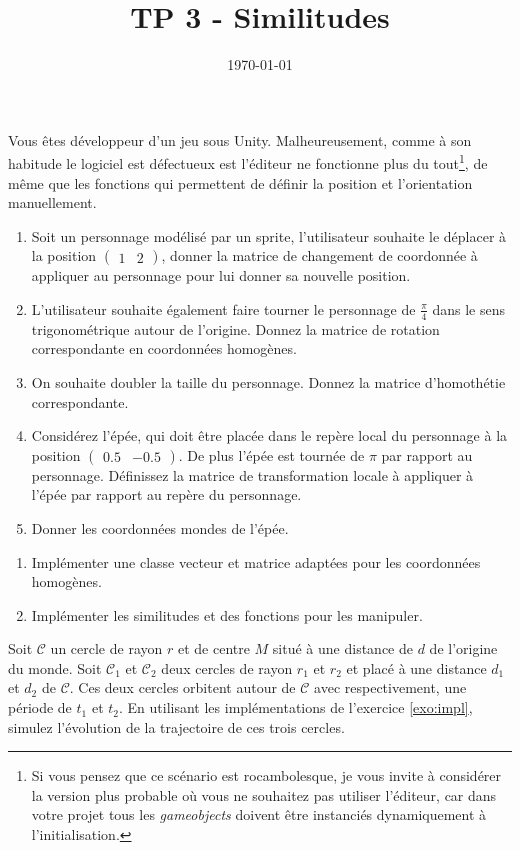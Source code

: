 \documentclass[a4paper,12pt]{article}
\title{TP 3 - Similitudes}
\author{}
\date{\today}
\begin{document}
\makeonlytitle


\label{exo:theorique}

Vous êtes développeur d'un jeu sous Unity. Malheureusement, comme à son habitude le logiciel est défectueux est l'éditeur ne fonctionne plus du tout\footnote{Si vous pensez que ce scénario est rocambolesque, je vous invite à considérer la version plus probable où vous ne souhaitez pas utiliser l'éditeur, car dans votre projet tous les \textit{gameobjects} doivent être instanciés dynamiquement à l'initialisation.}, de même que les fonctions qui permettent de définir la position et l'orientation manuellement.  

\begin{enumerate}
  \item Soit un personnage modélisé par un sprite, l'utilisateur souhaite le déplacer à la position $\begin{pmatrix} 1 & 2\end{pmatrix}$, donner la matrice de changement de coordonnée à appliquer au personnage pour lui donner sa nouvelle position.
  \item L'utilisateur souhaite également faire tourner le personnage de \(\frac{\pi}{4}\) dans le sens trigonométrique autour de l'origine. Donnez la matrice de rotation correspondante en coordonnées homogènes.
  \item On souhaite doubler la taille du personnage. Donnez la matrice d'homothétie correspondante.
  \item Considérez l'épée, qui doit être placée dans le repère local du personnage à la position $\begin{pmatrix} 0.5 & -0.5 \end{pmatrix}$. De plus l'épée est tournée de $\pi$ par rapport au personnage. Définissez la matrice de transformation locale à appliquer à l'épée par rapport au repère du personnage.
  \item Donner les coordonnées mondes de l'épée.
\end{enumerate}

\label{exo:impl}


\begin{enumerate}
  \item Implémenter une classe vecteur et matrice adaptées pour les coordonnées homogènes.
  \item Implémenter les similitudes et des fonctions pour les manipuler.
\end{enumerate}


Soit $\mathcal{C}$ un cercle de rayon $r$ et de centre $M$ situé à une distance de $d$ de l'origine du monde. Soit $\mathcal{C}_1$ et $\mathcal{C}_2$ deux cercles de rayon $r_1$ et $r_2$ et placé à une distance $d_1$ et $d_2$ de $\mathcal{C}$. Ces deux cercles orbitent autour de $\mathcal{C}$ avec respectivement, une période de $t_1$ et $t_2$.
En utilisant les implémentations de l'exercice \ref{exo:impl}, simulez l'évolution de la trajectoire de ces trois cercles.
\end{document}

